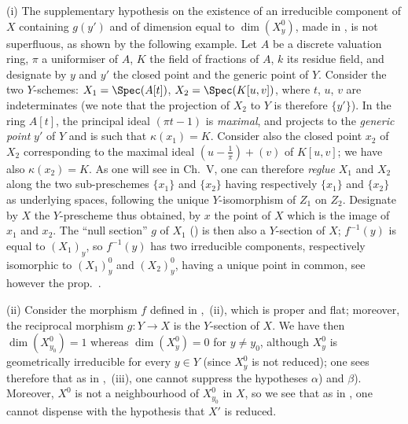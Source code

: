 \begin{remarks}[15.6.10]
\label{IV.15.6.10}
(i)
The supplementary hypothesis on the existence of an irreducible component of $X$ containing $g(y')$ and of dimension equal to $\dim(X_y^0)$, made in , is not superfluous, as shown by the following example.
Let $A$ be a discrete valuation ring, $\pi$ a uniformiser of $A$, $K$ the field of fractions of $A$, $k$ its residue field, and designate by $y$ and $y'$ the closed point and the generic point of $Y$.
Consider the two $Y$-schemes: $X_1=\Spec(A[t])$, $X_2=\Spec(K[u,v])$, where $t$, $u$, $v$ are indeterminates (we note that the projection of $X_2$ to $Y$ is therefore $\{y'\}$).
In the ring $A[t]$, the principal ideal $(\pi t-1)$ is \emph{maximal}, and projects to the \emph{generic point} $y'$ of $Y$ and is such that $\kappa(x_1)=K$.
Consider also the closed point $x_2$ of $X_2$ corresponding to the maximal ideal $\left(u-\frac{1}{\pi}\right)+(v)$ of $K[u,v]$; we have also $\kappa(x_2)=K$.
As one will see in Ch.\ V, one can therefore \emph{reglue} $X_1$ and $X_2$ along the two sub-preschemes $\{x_1\}$ and $\{x_2\}$ having respectively $\{x_1\}$ and $\{x_2\}$ as underlying spaces, following the unique $Y$-isomorphism of $Z_1$ on $Z_2$.
Designate by $X$ the $Y$-prescheme thus obtained, by $x$ the point of $X$ which is the image of $x_1$ and $x_2$.
The ``null section'' $g$ of $X_1$ () is then also a $Y$-section of $X$; $f^{-1}(y)$ is equal to $(X_1)_y$, so $f^{-1}(y)$ has two irreducible components, respectively isomorphic to $(X_1)_y^0$ and $(X_2)_y^0$, having a unique point in common, see however the prop.\ .

(ii)
Consider the morphism $f$ defined in ,~(ii), which is proper and flat; moreover, the reciprocal morphism $g:Y\to X$ is the $Y$-section of $X$.
We have then $\dim(X_{y_0}^0)=1$ whereas $\dim(X_y^0)=0$ for $y\neq y_0$, although $X_y^0$ is geometrically irreducible for every $y\in Y$ (since $X_y^0$ is not reduced); one sees therefore that as in ,~(iii), one cannot suppress the hypotheses $\alpha$) and $\beta$).
Moreover, $X^0$ is not a neighbourhood of $X_{y_0}^0$ in $X$, so we see that as in , one cannot dispense with the hypothesis that $X'$ is reduced.


\end{remarks}
